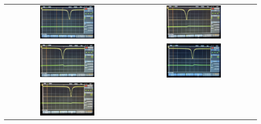 \begin{center}
    \captionsetup{type=figure}
    \begin{tabular}{c c}
        \includegraphics[width=0.45\textwidth]{Bilder/Modulationsindex/mindex_600.jpg} 
        & \includegraphics[width=0.45\textwidth]{Bilder/Modulationsindex/mindex_800.jpg} \\
        \includegraphics[width=0.45\textwidth]{Bilder/Modulationsindex/mindex_1000.jpg}
        & \includegraphics[width=0.45\textwidth]{Bilder/Modulationsindex/mindex_1200.jpg} \\
        \includegraphics[width=0.45\textwidth]{Bilder/Modulationsindex/mindex_1350.jpg}
    \end{tabular}
    \label{fig:mindex2}
\end{center}

